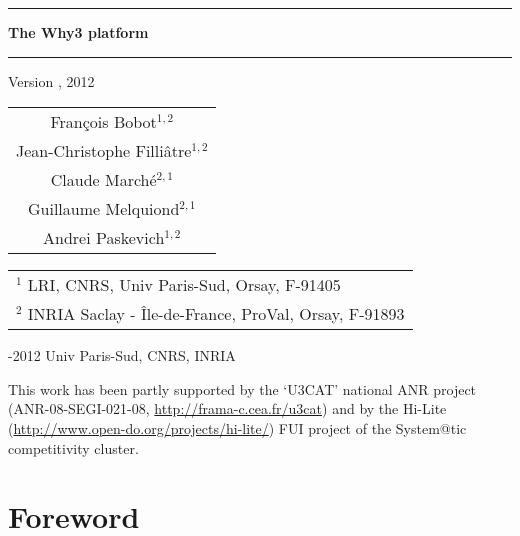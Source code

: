 \documentclass[a4paper,11pt,twoside,openright]{memoir}
\begin{document}
\sloppy
{}

\thispagestyle{empty}

\begin{center}

\rule\textwidth{0.8mm}

\vfill

{\fontsize{40}{40pt}\selectfont\bfseries\sffamily The Why3 platform}

\vfill

\rule\textwidth{0.8mm}

\vfill



\begin{LARGE}
  Version \whyversion{},  2012
\end{LARGE}

\vfill

\begin{Large}
  \begin{tabular}{c}
  Fran\c{c}ois Bobot$^{1,2}$ \\
  Jean-Christophe Filli\^atre$^{1,2}$  \\
  Claude March\'e$^{2,1}$ \\
  Guillaume Melquiond$^{2,1}$\\
  Andrei Paskevich$^{1,2}$
\end{tabular}
\end{Large}
\vfill

\begin{flushleft}

\begin{tabular}{l}
$^1$ LRI, CNRS, Univ Paris-Sud, Orsay, F-91405 \\
$^2$ INRIA Saclay - \^Ile-de-France, ProVal, Orsay, F-91893
\end{tabular}

\bigskip

  -2012 Univ Paris-Sud, CNRS, INRIA

  This work has been partly supported by the `U3CAT' national ANR project
  (ANR-08-SEGI-021-08, \url{http://frama-c.cea.fr/u3cat}) and by the
  Hi-Lite (\url{http://www.open-do.org/projects/hi-lite/}) FUI project of the
  System@tic competitivity cluster.

\end{flushleft}
\end{center}

\chapter*{Foreword}
\end{document}

